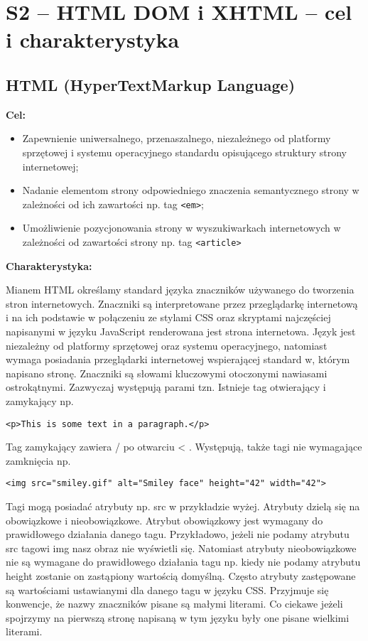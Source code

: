 \section{S2 -- HTML DOM i XHTML -- cel i charakterystyka}

\subsection{HTML (HyperTextMarkup Language)}

\textbf{Cel:}
\begin{itemize}
\item Zapewnienie uniwersalnego, przenaszalnego, niezależnego od platformy sprzętowej i systemu operacyjnego standardu opisującego struktury strony internetowej;
\item Nadanie elementom strony odpowiedniego znaczenia semantycznego strony w zależności od ich zawartości np. tag \texttt{<em>};
\item Umożliwienie pozycjonowania strony w wyszukiwarkach internetowych w zależności od zawartości strony np. tag \texttt{<article>}
\end{itemize}

\textbf{Charakterystyka:}

Mianem HTML określamy standard języka znaczników używanego do tworzenia stron internetowych. Znaczniki są interpretowane przez przeglądarkę internetową i na ich podstawie w połączeniu ze stylami CSS oraz skryptami najczęściej napisanymi w języku JavaScript renderowana jest strona internetowa. Język jest niezależny od platformy sprzętowej oraz systemu operacyjnego, natomiast wymaga posiadania przeglądarki internetowej wspierającej standard w, którym napisano stronę. Znaczniki są słowami kluczowymi otoczonymi nawiasami ostrokątnymi. Zazwyczaj występują parami tzn. Istnieje tag otwierający i zamykający np.

\texttt{<p>This is some text in a paragraph.</p>}

Tag zamykający zawiera / po otwarciu < . Występują, także tagi nie wymagające zamknięcia np. 

\texttt{<img src="smiley.gif" alt="Smiley face" height="42" width="42">}

Tagi mogą posiadać atrybuty np. src w przykładzie wyżej. Atrybuty dzielą się na obowiązkowe i nieobowiązkowe. Atrybut obowiązkowy jest wymagany do prawidłowego działania danego tagu. Przykładowo, jeżeli nie podamy atrybutu src tagowi img nasz obraz nie wyświetli się. Natomiast atrybuty nieobowiązkowe nie są wymagane do prawidłowego działania tagu np. kiedy nie podamy atrybutu height zostanie on zastąpiony wartością domyślną. Często atrybuty zastępowane są wartościami ustawianymi dla danego tagu w języku CSS. Przyjmuje się konwencje, że nazwy znaczników pisane są małymi literami. Co ciekawe jeżeli spojrzymy na pierwszą stronę napisaną w tym języku były one pisane wielkimi literami.

